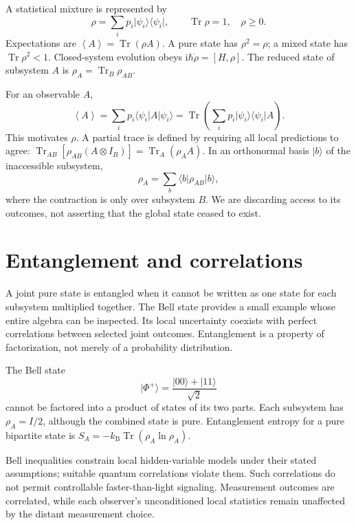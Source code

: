 \documentclass[11pt,oneside]{book}
\newcommand{\ii}{\mathrm{i}}
\newcommand{\avg}[1]{\left\langle #1\right\rangle}
\newcommand{\ket}[1]{\lvert #1\rangle}
\newcommand{\bra}[1]{\langle #1\rvert}
\newcommand{\kb}{k_{\mathrm B}}
\theoremstyle{reviewstyle}
\begin{document}
A statistical mixture is represented by
\begin{equation}\rho=\sum_i p_i\ket{\psi_i}\bra{\psi_i},\qquad \operatorname{Tr}\rho=1,\quad \rho\geq0.\end{equation}
Expectations are $\avg A=\operatorname{Tr}(\rho A)$. A pure state has $\rho^2=\rho$; a mixed state has $\operatorname{Tr}\rho^2<1$. Closed-system evolution obeys $\ii\hbar\dot\rho=[H,\rho]$. The reduced state of subsystem $A$ is $\rho_A=\operatorname{Tr}_B\rho_{AB}$.

For an observable $A$,
\begin{equation}
\avg A=\sum_ip_i\bra{\psi_i}A\ket{\psi_i}
=\operatorname{Tr}\left(\sum_ip_i\ket{\psi_i}\bra{\psi_i}A\right).
\end{equation}
This motivates $\rho$. A partial trace is defined by requiring all local predictions to agree: $\operatorname{Tr}_{AB}[\rho_{AB}(A\otimes I_B)]=\operatorname{Tr}_A(\rho_AA)$. In an orthonormal basis $\ket b$ of the inaccessible subsystem,
\begin{equation}
\rho_A=\sum_b\bra b\rho_{AB}\ket b,
\end{equation}
where the contraction is only over subsystem $B$. We are discarding access to its outcomes, not asserting that the global state ceased to exist.

\section{Entanglement and correlations}
A joint pure state is entangled when it cannot be written as one state for each subsystem multiplied together. The Bell state provides a small example whose entire algebra can be inspected. Its local uncertainty coexists with perfect correlations between selected joint outcomes. Entanglement is a property of factorization, not merely of a probability distribution.

The Bell state
\begin{equation}\ket{\Phi^+}=\frac{\ket{00}+\ket{11}}{\sqrt2}\end{equation}
cannot be factored into a product of states of its two parts. Each subsystem has $\rho_A=I/2$, although the combined state is pure. Entanglement entropy for a pure bipartite state is
$S_A=-\kb\operatorname{Tr}(\rho_A\ln\rho_A)$.

Bell inequalities constrain local hidden-variable models under their stated assumptions; suitable quantum correlations violate them. Such correlations do not permit controllable faster-than-light signaling. Measurement outcomes are correlated, while each observer's unconditioned local statistics remain unaffected by the distant measurement choice.
\end{document}
